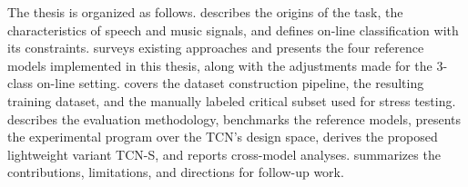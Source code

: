 The thesis is organized as follows.
 describes the origins of the task, the characteristics of speech and music signals, and defines on-line classification with its constraints.
 surveys existing approaches and presents the four reference models implemented in this thesis, along with the adjustments made for the 3-class on-line setting.
 covers the dataset construction pipeline, the resulting training dataset, and the manually labeled critical subset used for stress testing.
 describes the evaluation methodology, benchmarks the reference models, presents the experimental program over the TCN's design space, derives the proposed lightweight variant TCN-S, and reports cross-model analyses.
 summarizes the contributions, limitations, and directions for follow-up work.
